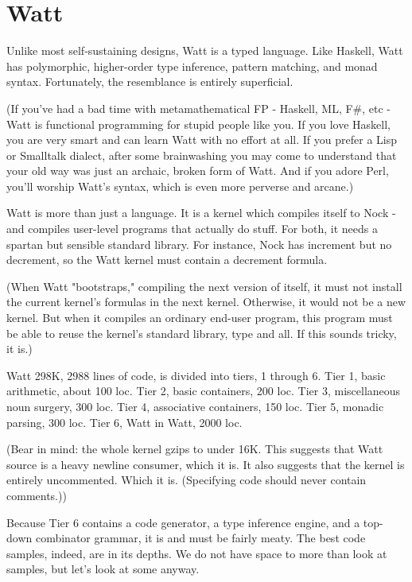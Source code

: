\documentclass[10pt, nocopyrightspace]{sigplanconf}
\begin{document}
\section{Watt}

Unlike most self-sustaining designs, Watt is a typed language.
Like Haskell, Watt has polymorphic, higher-order type inference,
pattern matching, and monad syntax.  Fortunately, the resemblance
is entirely superficial.

(If you've had a bad time with metamathematical FP - Haskell, ML,
F\#, etc - Watt is functional programming for stupid people like
you.  If you love Haskell, you are very smart and can learn Watt
with no effort at all.  If you prefer a Lisp or Smalltalk
dialect, after some brainwashing you may come to understand that
your old way was just an archaic, broken form of Watt.  And if
you adore Perl, you'll worship Watt's syntax, which is even more
perverse and arcane.)

Watt is more than just a language.  It is a kernel which compiles
itself to Nock - and compiles user-level programs that actually
do stuff.  For both, it needs a spartan but sensible standard
library.  For instance, Nock has increment but no decrement, so
the Watt kernel must contain a decrement formula.

(When Watt "bootstraps," compiling the next version of itself, it
must not install the current kernel's formulas in the next
kernel.  Otherwise, it would not be a new kernel.  But when it
compiles an ordinary end-user program, this program must be able
to reuse the kernel's standard library, type and all.  If this
sounds tricky, it is.)

Watt 298K, 2988 lines of code, is divided into tiers, 1 through
6.  Tier 1, basic arithmetic, about 100 loc.  Tier 2, basic
containers, 200 loc.  Tier 3, miscellaneous noun surgery, 300
loc.  Tier 4, associative containers, 150 loc.  Tier 5, monadic 
parsing, 300 loc.  Tier 6, Watt in Watt, 2000 loc.

(Bear in mind: the whole kernel gzips to under 16K.  This
suggests that Watt source is a heavy newline consumer, which it
is.  It also suggests that the kernel is entirely uncommented.
Which it is.  (Specifying code should never contain comments.))

Because Tier 6 contains a code generator, a type inference
engine, and a top-down combinator grammar, it is and must be
fairly meaty.  The best code samples, indeed, are in its depths.
We do not have space to more than look at samples, but let's look
at some anyway.
\end{document}
